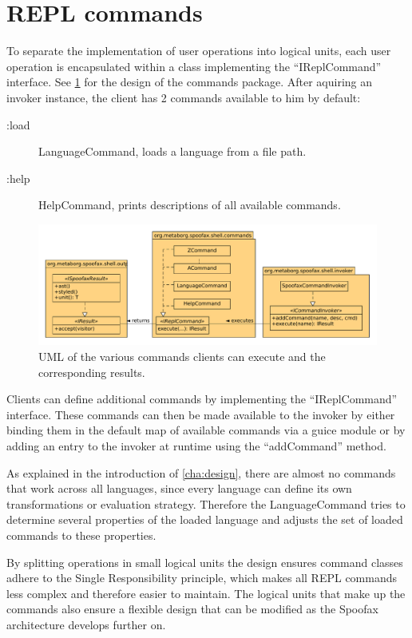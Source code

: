 \section{REPL commands}
\label{sec:commands}

To separate the implementation of user operations into logical units, each user
operation is encapsulated within a class implementing the ``IReplCommand''
interface. See \cref{fig:uml-commands} for the design of the commands package.
After aquiring an invoker instance, the client has 2 commands available to him
by default:

\begin{description}
  \item [:load] LanguageCommand, loads a language from a file path.
  \item [:help] HelpCommand, prints descriptions of all available commands.
\end{description}

\begin{figure}[h]
  \centering
  \includegraphics[width=\textwidth]{uml-commands}
  \caption{UML of the various commands clients can execute and the
           corresponding results.}
  \label{fig:uml-commands}
\end{figure}

Clients can define additional commands by implementing the ``IReplCommand''
interface. These commands can then be made available to the invoker by either
binding them in the default map of available commands via a guice module or by
adding an entry to the invoker at runtime using the ``addCommand'' method.

As explained in the introduction of \cref{cha:design}, there are almost no
commands that work across all languages, since every language can define its
own transformations or evaluation strategy. Therefore the LanguageCommand tries
to determine several properties of the loaded language and adjusts the set of
loaded commands to these properties.

By splitting operations in small logical units the design ensures command
classes adhere to the Single Responsibility principle, which makes all REPL
commands less complex and therefore easier to maintain. The logical units that
make up the commands also ensure a flexible design that can be modified
as the Spoofax architecture develops further on.

